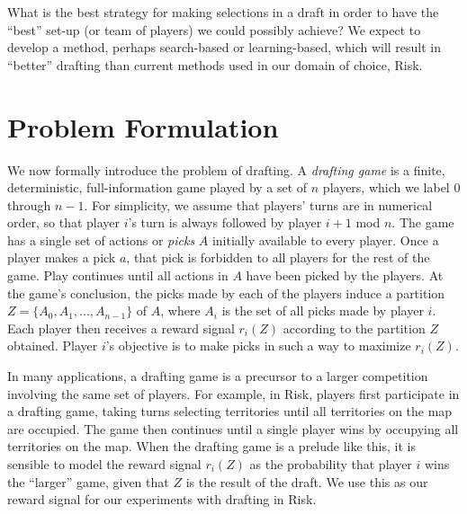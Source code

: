 \documentclass[letterpaper]{article}
\numberwithin{equation}{section}
\numberwithin{theorem}{section}
\numberwithin{lemma}{section}
\numberwithin{df}{section}
\begin{document}

What is the best strategy for making selections in a draft in order to have the ``best'' set-up (or team of players) we could possibly achieve?  We expect to develop a method, perhaps search-based or learning-based, which will result in ``better'' drafting than current methods used in our domain of choice, Risk.

\section{Problem Formulation}
\label{sec:Prob}


We now formally introduce the problem of drafting.  A \emph{drafting game} is a finite, deterministic, full-information game played by a set of $n$ players, which we label 0 through $n-1$.  For simplicity, we assume that players' turns are in numerical order, so that player $i$'s turn is always followed by player $i+1$ mod $n$.  The game has a single set of actions or \emph{picks} $A$ initially available to every player.  Once a player makes a pick $a$, that pick is forbidden to all players for the rest of the game.  Play continues until all actions in $A$ have been picked by the players.  At the game's conclusion, the picks made by each of the players induce a partition $Z = \{A_0, A_1, ..., A_{n-1}\}$ of $A$, where $A_i$ is the set of all picks made by player $i$.  Each player then receives a reward signal $r_i(Z)$ according to the partition $Z$ obtained.  Player $i$'s objective is to make picks in such a way to maximize $r_i(Z)$.

In many applications, a drafting game is a precursor to a larger competition involving the same set of players.  For example, in Risk, players first participate in a drafting game, taking turns selecting territories until all territories on the map are occupied.  The game then continues until a single player wins by occupying all territories on the map.  When the drafting game is a prelude like this, it is sensible to model the reward signal $r_i(Z)$ as the probability that player $i$ wins the ``larger'' game, given that $Z$ is the result of the draft.  We use this as our reward signal for our experiments with drafting in Risk.
\end{document}
